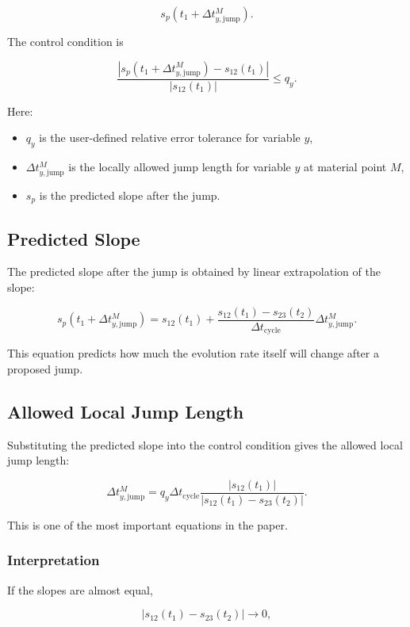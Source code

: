 ﻿\documentclass[11pt,a4paper]{article}
\begin{document}
\[
s_p\left(t_1+\Delta t^M_{y,\mathrm{jump}}\right).
\]

The control condition is

\[
\frac{
\left|
s_p\left(t_1+\Delta t^M_{y,\mathrm{jump}}\right)
-
s_{12}(t_1)
\right|
}{
\left|s_{12}(t_1)\right|
}
\leq q_y.
\]

Here:

\begin{itemize}[leftmargin=*]
    \item $q_y$ is the user-defined relative error tolerance for variable $y$,
    \item $\Delta t^M_{y,\mathrm{jump}}$ is the locally allowed jump length for variable $y$ at material point $M$,
    \item $s_p$ is the predicted slope after the jump.
\end{itemize}

\subsection{Predicted Slope}

The predicted slope after the jump is obtained by linear extrapolation of the slope:

\[
s_p\left(t_1+\Delta t^M_{y,\mathrm{jump}}\right)
=
s_{12}(t_1)
+
\frac{
s_{12}(t_1)-s_{23}(t_2)
}{
\Delta t_{\mathrm{cycle}}
}
\Delta t^M_{y,\mathrm{jump}}.
\]

This equation predicts how much the evolution rate itself will change after a proposed jump.

\subsection{Allowed Local Jump Length}

Substituting the predicted slope into the control condition gives the allowed local jump length:

\[
\Delta t^M_{y,\mathrm{jump}}
=
q_y \Delta t_{\mathrm{cycle}}
\frac{
\left|s_{12}(t_1)\right|
}{
\left|s_{12}(t_1)-s_{23}(t_2)\right|
}.
\]

This is one of the most important equations in the paper.

\subsubsection*{Interpretation}

If the slopes are almost equal,

\[
\left|s_{12}(t_1)-s_{23}(t_2)\right| \rightarrow 0,
\]
\end{document}
